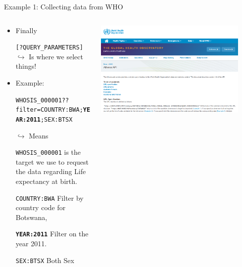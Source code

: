 \documentclass[xcolor=x11names, aspectratio=169, compress]{beamer}
\renewcommand{\(}{\begin{columns}}
\renewcommand{\)}{\end{columns}}
\newcommand{\<}[1]{\begin{column}{#1}}
\renewcommand{\>}{\end{column}}
\begin{document}
\begin{frame}{Example 1: Collecting data from WHO}
\begin{columns}[T]
  \begin{column}{0.8\textwidth}
    \begin{itemize}[<+->]
       \item Finally
       \item[]\small{\texttt{[?QUERY\_PARAMETERS]}} $\hookrightarrow$ Is where we select things!
       \item Example:
       \item[]\small{\texttt{\textcolor{brique}{WHOSIS\_000001}??filter=\textcolor{siap}{COUNTRY:BWA};\textbf{YEAR:2011};\textcolor{vert}{SEX:BTSX}}}
       \item[$\hookrightarrow$ ] Means
        \item[]\texttt{\textcolor{brique}{WHOSIS\_000001}} is the target we use to request the data regarding Life expectancy at birth.
        \item[]\texttt{\textcolor{siap}{COUNTRY:BWA}} Filter by country  code for Botswana,
        \item[]\texttt{\textbf{YEAR:2011}} Filter on the year 2011.
         \item[]\texttt{\textcolor{vert}{SEX:BTSX}} Both Sex
     \end{itemize}
     \end{column}

    \begin{column}{0.2\textwidth}
    \begin{center}
      \href{https://www.who.int/data/gho/info/athena-api}{\includegraphics[width=0.9\textwidth]{WHO_API.PNG}}
    \end{center}
    \end{column}
\end{columns}
\end{frame}
\end{document}
